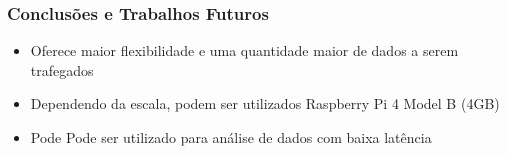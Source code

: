 \documentclass[hyperref={bookmarks=false},aspectratio=169]{beamer}
\begin{document}
\begin{frame}
\frametitle{Conclusões e Trabalhos Futuros}
\begin{itemize}
    \item Oferece maior flexibilidade e uma quantidade maior de dados a serem trafegados
    \item Dependendo da escala, podem ser utilizados Raspberry Pi 4 Model B (4GB)
    \item Pode Pode ser utilizado para análise de dados com baixa latência
\end{itemize}
\end{frame}
\end{document}
